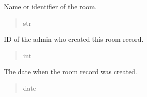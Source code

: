 \documentclass[letterpaper,10pt,english]{sphinxmanual}
\begin{document}
\begin{fulllineitems}

\begin{fulllineitems}
\label{\detokenize{app.models:app.models.room.Room.roomName}}
\pysigstartsignatures
\pysigline
{}
\pysigstopsignatures
\sphinxAtStartPar
Name or identifier of the room.
\begin{quote}\begin{description}
\sphinxAtStartPar
str

\end{description}\end{quote}

\end{fulllineitems}


\begin{fulllineitems}
\label{\detokenize{app.models:app.models.room.Room.createdBy}}
\pysigstartsignatures
\pysigline
{}
\pysigstopsignatures
\sphinxAtStartPar
ID of the admin who created this room record.
\begin{quote}\begin{description}
\sphinxAtStartPar
int

\end{description}\end{quote}

\end{fulllineitems}


\begin{fulllineitems}
\label{\detokenize{app.models:app.models.room.Room.createDate}}
\pysigstartsignatures
\pysigline
{}
\pysigstopsignatures
\sphinxAtStartPar
The date when the room record was created.
\begin{quote}\begin{description}
\sphinxAtStartPar
date

\end{description}\end{quote}

\end{fulllineitems}


\end{fulllineitems}
\end{document}
